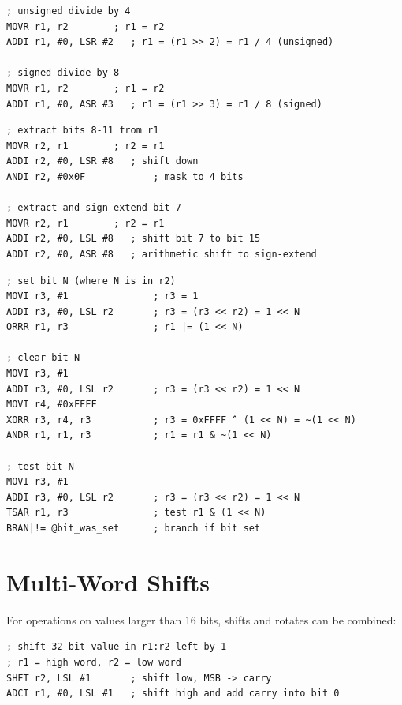 \begin{example}
	\begin{lstlisting}
; unsigned divide by 4
MOVR r1, r2        ; r1 = r2
ADDI r1, #0, LSR #2   ; r1 = (r1 >> 2) = r1 / 4 (unsigned)

; signed divide by 8
MOVR r1, r2        ; r1 = r2
ADDI r1, #0, ASR #3   ; r1 = (r1 >> 3) = r1 / 8 (signed)
	\end{lstlisting}
	\caption{Division by Powers of 2}
\end{example}

\begin{example}
	\begin{lstlisting}
; extract bits 8-11 from r1
MOVR r2, r1        ; r2 = r1
ADDI r2, #0, LSR #8   ; shift down
ANDI r2, #0x0F            ; mask to 4 bits

; extract and sign-extend bit 7
MOVR r2, r1        ; r2 = r1
ADDI r2, #0, LSL #8   ; shift bit 7 to bit 15
ADDI r2, #0, ASR #8   ; arithmetic shift to sign-extend
	\end{lstlisting}
	\caption{Bit Field Extraction}
\end{example}

\begin{example}
	\begin{lstlisting}
; set bit N (where N is in r2)
MOVI r3, #1               ; r3 = 1
ADDI r3, #0, LSL r2       ; r3 = (r3 << r2) = 1 << N
ORRR r1, r3               ; r1 |= (1 << N)

; clear bit N
MOVI r3, #1
ADDI r3, #0, LSL r2       ; r3 = (r3 << r2) = 1 << N
MOVI r4, #0xFFFF
XORR r3, r4, r3           ; r3 = 0xFFFF ^ (1 << N) = ~(1 << N)
ANDR r1, r1, r3           ; r1 = r1 & ~(1 << N)

; test bit N
MOVI r3, #1
ADDI r3, #0, LSL r2       ; r3 = (r3 << r2) = 1 << N
TSAR r1, r3               ; test r1 & (1 << N)
BRAN|!= @bit_was_set      ; branch if bit set
	\end{lstlisting}
	\caption{Bit Manipulation}
\end{example}

\section{Multi-Word Shifts}

For operations on values larger than 16 bits, shifts and rotates can be combined:

\begin{example}
	\begin{lstlisting}
; shift 32-bit value in r1:r2 left by 1
; r1 = high word, r2 = low word
SHFT r2, LSL #1       ; shift low, MSB -> carry
ADCI r1, #0, LSL #1   ; shift high and add carry into bit 0
	\end{lstlisting}
	\caption{32-bit Left Shift}
\end{example}

